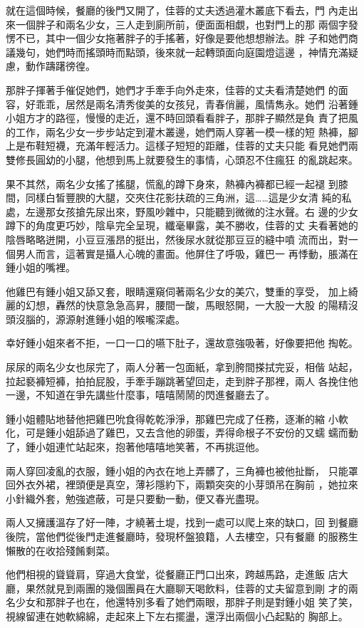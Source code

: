 就在這個時候，餐廳的後門又開了，佳蓉的丈夫透過灌木叢底下看去，門
內走出來一個胖子和兩名少女，三人走到廁所前，便面面相覷，也對門上的那
兩個字發愣不已，其中一個少女拖著胖子的手搖著，好像是要他想想辦法。胖
子和她們商議幾句，她們時而搖頭時而點頭，後來就一起轉頭面向庭園燈這邊
，神情充滿疑慮，動作躊躇徬徨。

那胖子揮著手催促她們，她們才手牽手向外走來，佳蓉的丈夫看清楚她們
的面容，好乖乖，居然是兩名清秀俊美的女孩兒，青春俏麗，風情雋永。她們
沿著鍾小姐方才的路徑，慢慢的走近，還不時回頭看看胖子，那胖子顯然是負
責了把風的工作，兩名少女一步步站定到灌木叢邊，她們兩人穿著一模一樣的短
熱褲，腳上是布鞋短襪，充滿年輕活力。這樣子短短的距離，佳蓉的丈夫只能
看見她們兩雙修長圓幼的小腿，他想到馬上就要發生的事情，心頭忍不住瘋狂
的亂跳起來。

果不其然，兩名少女搖了搖腿，慌亂的蹲下身來，熱褲內褲都已經一起褪
到膝間，同樣白皙豐腴的大腿，交夾住花影扶疏的三角洲，這……這是少女清
純的私處，左邊那女孩搶先尿出來，野風吵雜中，只能聽到微微的注水聲。右
邊的少女蹲下的角度更巧妙，陰阜完全呈現，纖毫畢露，美不勝收，佳蓉的丈
夫看著她的陰唇略略迸開，小豆豆漲昂的挺出，然後尿水就從那豆豆的縫中噴
流而出，對一個男人而言，這著實是攝人心魄的畫面。他屏住了呼吸，雞巴一
再悸動，脹滿在鍾小姐的嘴裡。

他雞巴有鍾小姐又舔又套，眼睛還窺伺著兩名少女的美穴，雙重的享受，
加上綺麗的幻想，轟然的快意急急高昇，腰間一酸，馬眼怒開，一大股一大股
的陽精沒頭沒腦的，源源射進鍾小姐的喉嚨深處。

幸好鍾小姐來者不拒，一口一口的嚥下肚子，還故意強吸著，好像要把他
掏乾。

尿尿的兩名少女也尿完了，兩人分著一包面紙，拿到胯間搽拭完妥，相偕
站起，拉起褻褲短褲，拍拍屁股，手牽手蹦跳著望回走，走到胖子那裡，兩人
各挽住他一邊，不知道在爭先講些什麼事，嘻嘻鬧鬧的閃進餐廳去了。

鍾小姐體貼地替他把雞巴吮食得乾乾淨淨，那雞巴完成了任務，逐漸的縮
小軟化，可是鍾小姐舔過了雞巴，又去含他的卵蛋，弄得命根子不安份的又蠕
蠕而動了，鍾小姐連忙站起來，抱著他嘻嘻地笑著，不再挑逗他。

兩人穿回凌亂的衣服，鍾小姐的內衣在地上弄髒了，三角褲也被他扯斷，
只能罩回外衣外裙，裡頭便是真空，薄衫隱約下，兩顆突突的小芽頭吊在胸前
，她拉來小針織外套，勉強遮蔽，可是只要動一動，便又春光盡現。

兩人又擁護溫存了好一陣，才繞著土堤，找到一處可以爬上來的缺口，回
到餐廳後院，當他們從後門走進餐廳時，發現杯盤狼籍，人去樓空，只有餐廳
的服務生懶散的在收拾殘餚剩菜。

他們相視的聳聳肩，穿過大食堂，從餐廳正門口出來，跨越馬路，走進飯
店大廳，果然就見到兩團的幾個團員在大廳聊天喝飲料，佳蓉的丈夫留意到剛
才的兩名少女和那胖子也在，他還特別多看了她們兩眼，那胖子則是對鍾小姐
笑了笑，視線留連在她軟綿綿，走起來上下左右擺盪，還浮出兩個小凸起點的
胸部上。

